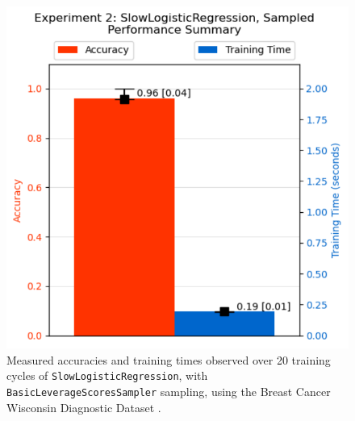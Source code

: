 \documentclass{article}
\theoremstyle{plain}
\theoremstyle{definition}
\theoremstyle{remark}
\begin{document}
\begin{figure}[ht]
\vskip 0.2in
\begin{center}
\centerline{\includegraphics[width=\columnwidth]{experiment_2b}}
\caption{Measured accuracies and training times observed over 20 training cycles of \texttt{SlowLogisticRegression}, with \texttt{BasicLeverageScoresSampler} sampling, using the Breast Cancer Wisconsin Diagnostic Dataset \cite{breastcancer}.}
\label{experiment_1a}
\end{center}
\vskip -0.2in
\end{figure}
\end{document}
